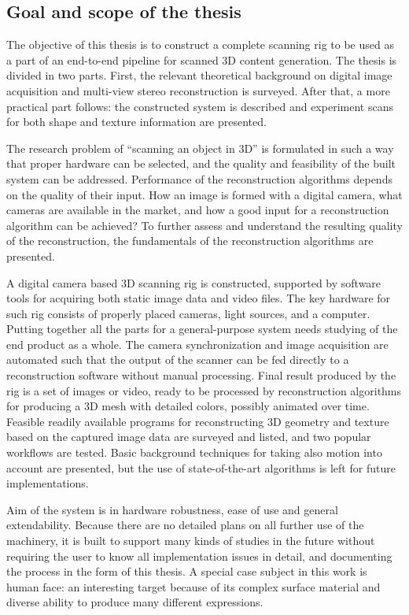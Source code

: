 \subsection{Goal and scope of the thesis}

The objective of this thesis is to construct a complete scanning rig to be used as a part of an end-to-end pipeline for scanned 3D content generation.
The thesis is divided in two parts.
First, the relevant theoretical background on digital image acquisition and multi-view stereo reconstruction is surveyed.
After that, a more practical part follows: the constructed system is described and experiment scans for both shape and texture information are presented.

The research problem of ``scanning an object in 3D'' is formulated in such a way that proper hardware can be selected, and the quality and feasibility of the built system can be addressed.
Performance of the reconstruction algorithms depends on the quality of their input.
How an image is formed with a digital camera, what cameras are available in the market, and how a good input for a reconstruction algorithm can be achieved?
To further assess and understand the resulting quality of the reconstruction, the fundamentals of the reconstruction algorithms are presented.

A digital camera based 3D scanning rig is constructed, supported by software tools for acquiring both static image data and video files.
The key hardware for such rig consists of properly placed cameras, light sources, and a computer.
Putting together all the parts for a general-purpose system needs studying of the end product as a whole.
The camera synchronization and image acquisition are automated such that the output of the scanner can be fed directly to a reconstruction software without manual processing.
Final result produced by the rig is a set of images or video, ready to be processed by reconstruction algorithms for producing a 3D mesh with detailed colors, possibly animated over time.
Feasible readily available programs for reconstructing 3D geometry and texture based on the captured image data are surveyed and listed, and two popular workflows are tested.
Basic background techniques for taking also motion into account are presented, but the use of state-of-the-art algorithms is left for future implementations.

Aim of the system is in hardware robustness, ease of use and general extendability.
Because there are no detailed plans on all further use of the machinery, it is built to support many kinds of studies in the future without requiring the user to know all implementation issues in detail, and documenting the process in the form of this thesis.
A special case subject in this work is human face: an interesting target because of its complex surface material and diverse ability to produce many different expressions.

